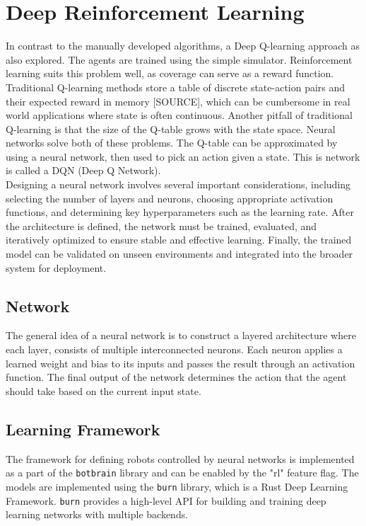 \section{Deep Reinforcement Learning}
\label{sec:rl}
In contrast to the manually developed algorithms, a Deep Q-learning approach as also explored. The agents are trained using the simple simulator. Reinforcement learning suits this problem well, as coverage can serve as a reward function. Traditional Q-learning methods store a table of discrete state-action pairs and their expected reward in memory {\color{red}[SOURCE]}, which can be cumbersome in real world applications where state is often continuous. Another pitfall of traditional Q-learning is that the size of the Q-table grows with the state space. Neural networks solve both of these problems. The Q-table can be approximated by using a neural network, then used to pick an action given a state. This is network is called a DQN (Deep Q Network). \\

Designing a neural network involves several important considerations, including selecting the number of layers and neurons, choosing appropriate activation functions, and determining key hyperparameters such as the learning rate. After the architecture is defined, the network must be trained, evaluated, and iteratively optimized to ensure stable and effective learning. Finally, the trained model can be validated on unseen environments and integrated into the broader system for deployment.

\subsection{Network}
The general idea of a neural network is to construct a layered architecture where each layer, consists of multiple interconnected neurons. Each neuron applies a learned weight and bias to its inputs and passes the result through an activation function. The final output of the network determines the action that the agent should take based on the current input state.

\subsection{Learning Framework}
The framework for defining robots controlled by neural networks is implemented as a part of the \texttt{botbrain} library and can be enabled by the "rl" feature flag. The models are implemented using the \texttt{burn} \cite{burn} library, which is a Rust Deep Learning Framework. \texttt{burn} provides a high-level API for building and training deep learning networks with multiple backends. \\

